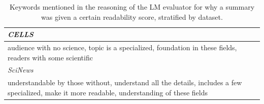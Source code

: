 \begin{table}[!h]
\begin{tabular}{p{}}
\vspace{-1mm}\textit{CELLS} \\ \hline
audience with no science, topic is a specialized, foundation in these fields, readers with some scientific
\\ 

\vspace{-1mm}\textit{SciNews}\\ \hline
understandable by those without, understand all the details, includes a few specialized, make it more readable, understanding of these fields \\ 
\end{tabular}
\caption{Keywords mentioned in the reasoning of the LM evaluator for why a summary was given a certain readability score, stratified by dataset.}
\label{tab:keywords_by_dataset}
\end{table}